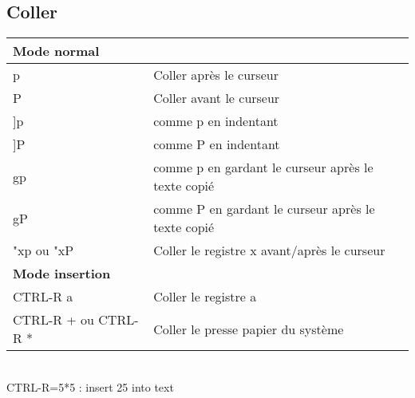 \documentclass{article}
\begin{document}
                    \subsection{Coller}
                    \begin{tabular}{|p{4cm}| l| }\hline
                        \multicolumn{2}{|l|}{\textbf{Mode normal }} \\ \hline
                        p & Coller après le curseur \\ \hline
                        P & Coller avant le curseur \\ \hline
                        ]p & comme p en indentant \\ \hline
                        ]P & comme P en indentant\\ \hline
                        gp & comme p en gardant le curseur après le texte copié \\ \hline
                        gP & comme P en gardant le curseur après le texte copié \\ \hline
                        "xp ou "xP &  Coller le registre x avant/après le curseur \\ \hline
                        \multicolumn{2}{|l|}{\textbf{Mode insertion}} \\ \hline
                        CTRL-R a & Coller le registre a \\ \hline
                        CTRL-R + ou CTRL-R * & Coller le presse papier du système\\ \hline
                    \end{tabular}\\
                    CTRL-R=5*5    : insert 25 into text
\end{document}
